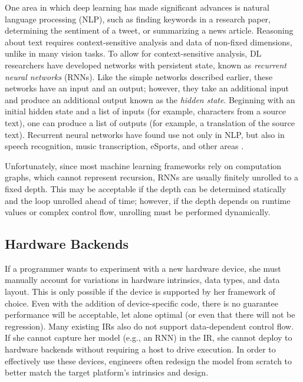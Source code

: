 One area in which deep learning has made significant advances is
  natural language processing (NLP), such as finding keywords in a
  research paper, determining the sentiment of a tweet,
  or summarizing a news article.
Reasoning about text requires context-sensitive analysis and data of
  non-fixed dimensions, unlike in many vision tasks.
To allow for context-sensitive analysis, DL researchers have developed networks with persistent
state, known as \textit{recurrent neural networks}  (RNNs). Like the simple networks described
earlier, these networks have an input and an output; however, they take an additional input and
produce an additional output known as the \textit{hidden state}. Beginning with an initial hidden
state and a list of inputs (for example, characters from a source text), one can produce a
list of outputs (for example, a translation of the source text). %
Recurrent neural networks have found use not only in NLP, but also in speech recognition, music
transcription, eSports, and other areas \cite{lstm, speech_recognition, OpenAI_dota}.

Unfortunately, since most machine learning frameworks rely on computation graphs,
  which cannot represent recursion, RNNs are usually finitely unrolled to a fixed depth.
This may be acceptable if the depth can be determined statically and the loop unrolled
  ahead of time; however, if the depth depends on runtime values or complex control flow,
  unrolling must be performed dynamically.

\subsection{Hardware Backends}

If a programmer wants to experiment with a new hardware device,
  she must manually account for variations in hardware intrinsics, data
  types, and data layout.
This is only possible if the device is supported by her framework of choice.
Even with the addition of device-specific code,
  there is no guarantee performance will be acceptable, let alone optimal
  (or even that there will not be regression).
Many existing IRs also do not support data-dependent control flow.
If she cannot capture her model (e.g., an RNN) in the IR,
  she cannot deploy to hardware backends without requiring a host to drive
  execution.
In order to effectively use these devices,
  engineers often redesign the model from scratch to better match the target
  platform's intrinsics and design.

